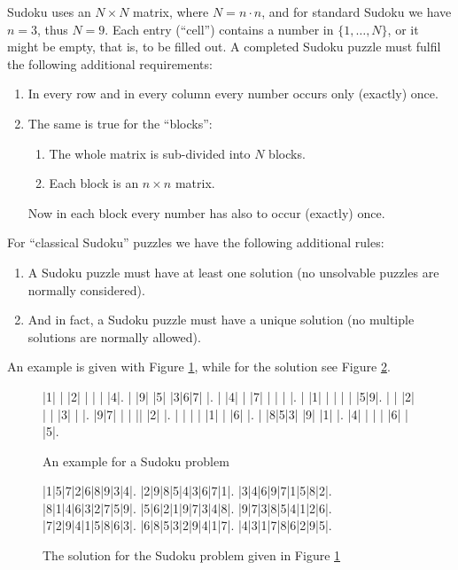 \documentclass[11pt]{report}
\begin{document}
Sudoku uses an $N \times N$ matrix, where $N = n \cdot n$, and for standard Sudoku we have $n = 3$, thus $N = 9$. Each entry (``cell'') contains a number in $\{1, \dots, N\}$, or it might be empty, that is, to be filled out. A completed Sudoku puzzle must fulfil the following additional requirements:
\begin{enumerate}
\item In every row and in every column every number occurs only (exactly) once.
\item The same is true for the ``blocks'':
\begin{enumerate}
\item The whole matrix is sub-divided into $N$ blocks.
\item Each block is an $n \times n$ matrix.
\end{enumerate}
Now in each block every number has also to occur (exactly) once.
\end{enumerate}
For ``classical Sudoku'' puzzles we have the following additional rules:
\begin{enumerate}
\item A Sudoku puzzle must have at least one solution (no unsolvable puzzles are normally considered).
\item And in fact, a Sudoku puzzle must have a unique solution (no multiple solutions are normally allowed).
\end{enumerate}
An example is given with Figure \ref{sudokuEx}, while for the solution see Figure \ref{fig:solutionsudokuEx}.

\begin{figure}[h]
\begin{sudoku}
 |1| | |2| | | | |4|.
 | |9| |5| |3|6|7| |.
 | |4| | |7| | | | |.
 | |1| | | | | |5|9|.
 | | |2| | | |3| | |.
 |9|7| | | || |2| |.
 | | | | |1| | |6| |.
 | |8|5|3| |9| |1| |.
 |4| | | | |6| | |5|.
\end{sudoku}
\caption{An example for a Sudoku problem}
\label{sudokuEx}
\end{figure}

\begin{figure}[h]
\begin{sudoku}
  |1|5|7|2|6|8|9|3|4|.
  |2|9|8|5|4|3|6|7|1|.
  |3|4|6|9|7|1|5|8|2|.
  |8|1|4|6|3|2|7|5|9|.
  |5|6|2|1|9|7|3|4|8|.
  |9|7|3|8|5|4|1|2|6|.
  |7|2|9|4|1|5|8|6|3|.
  |6|8|5|3|2|9|4|1|7|.
  |4|3|1|7|8|6|2|9|5|.
\end{sudoku}
\caption{The solution for the Sudoku problem given in Figure \ref{sudokuEx}}
\label{fig:solutionsudokuEx}
\end{figure}
\end{document}

